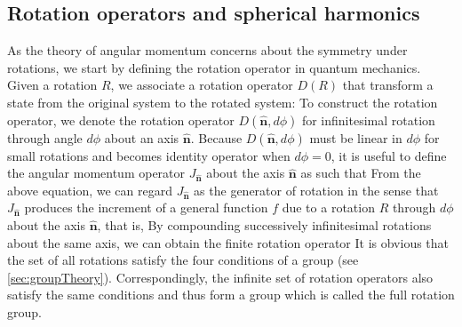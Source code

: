 \subsection{Rotation operators and spherical harmonics}

As the theory of angular
 momentum concerns about the symmetry under rotations, we start by defining the rotation operator in quantum 
 mechanics. Given a rotation $R$, we associate a rotation operator 
 $D(R)$ that transform a state from the original system to the rotated system:
To construct the rotation operator, we denote the rotation operator $D(\mathbf{\hat{n}}, d\phi)$ for infinitesimal 
rotation through angle $d\phi$ about an axis $\mathbf{\hat{n}}$. Because $D(\mathbf{\hat{n}}, d\phi)$ must be linear
in $d\phi$ for small rotations and becomes identity operator when $d\phi = 0$, it is useful to define the angular
 momentum operator $J_{\mathbf{\hat{n}}}$ about the axis $\mathbf{\hat{n}}$ as 
such that
From the above equation, we can regard $J_{\mathbf{\hat{n}}}$ as the generator of rotation in the sense that $ J_{\mathbf{\hat{n}}}$ produces the increment of a general function $f$ due to a rotation $R$ 
through $d\phi$ about the axis $\mathbf{\hat{n}}$, that is,
By compounding successively infinitesimal rotations about the same axis, we can obtain the finite rotation operator
It is obvious that the set of all rotations satisfy the four conditions of a group (see 
\autoref{sec:groupTheory}). Correspondingly, 
 the infinite set of rotation operators also satisfy the same conditions and thus form a group which is called the full 
rotation group. 


